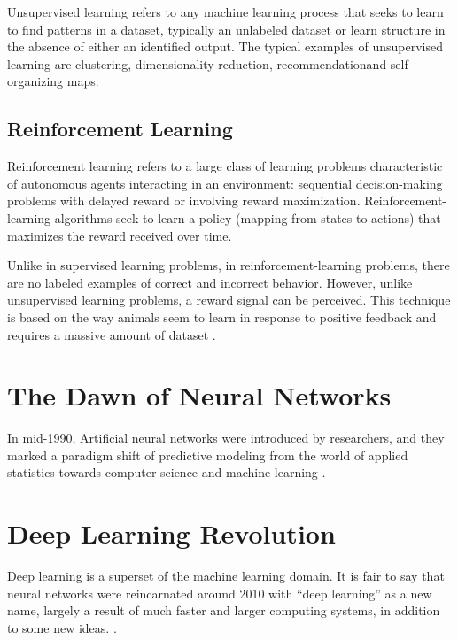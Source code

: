Unsupervised learning \cite{sammut2011encyclopedia} refers to any machine learning process that seeks to learn to find patterns in a dataset, typically an unlabeled dataset or learn structure in the absence of either an identified output. The typical examples of unsupervised learning are clustering, dimensionality reduction, recommendationand self-organizing maps.

\subsection*{Reinforcement Learning}

Reinforcement learning \cite{sammut2011encyclopedia} refers to a large class of learning problems characteristic of autonomous agents interacting in an environment: sequential decision-making problems with delayed reward or involving reward maximization. Reinforcement-learning algorithms seek to learn a policy (mapping from states to actions) that maximizes the reward received over time.

Unlike in supervised learning problems, in reinforcement-learning problems, there are no labeled examples of correct and incorrect behavior. However, unlike unsupervised learning problems, a reward signal can be perceived. This technique is based on the way animals seem to learn in response to positive feedback and requires a massive amount of dataset \cite{sammut2011encyclopedia}.

\section{The Dawn of Neural Networks}
In mid-1990, Artificial neural networks were introduced by researchers, and they marked a paradigm shift of predictive modeling from the world of applied statistics towards computer science and machine learning \cite{efron2016computer}.

\section{Deep Learning Revolution}

Deep learning is a superset of the machine learning domain. It is fair to say that neural networks were reincarnated around 2010 with “deep learning” as a new name, largely a result of much faster and larger computing systems, in addition to some new ideas. \cite{efron2016computer}.

